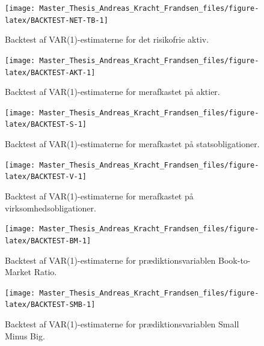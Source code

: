 \documentclass[
  a4paper,
  oneside]{memoir}
\begin{document}
\begin{figure}[H]

{\centering \texttt{[image: Master\_Thesis\_Andreas\_Kracht\_Frandsen\_files/figure-latex/BACKTEST-NET-TB-1]} 

}

\caption{Backtest af VAR(1)-estimaterne for det risikofrie aktiv.}\label{fig:BACKTEST-NET-TB}
\end{figure}

\begin{figure}[H]

{\centering \texttt{[image: Master\_Thesis\_Andreas\_Kracht\_Frandsen\_files/figure-latex/BACKTEST-AKT-1]} 

}

\caption{Backtest af VAR(1)-estimaterne for merafkastet på aktier.}\label{fig:BACKTEST-AKT}
\end{figure}

\begin{figure}[H]

{\centering \texttt{[image: Master\_Thesis\_Andreas\_Kracht\_Frandsen\_files/figure-latex/BACKTEST-S-1]} 

}

\caption{Backtest af VAR(1)-estimaterne for merafkastet på statsobligationer.}\label{fig:BACKTEST-S}
\end{figure}

\begin{figure}[H]

{\centering \texttt{[image: Master\_Thesis\_Andreas\_Kracht\_Frandsen\_files/figure-latex/BACKTEST-V-1]} 

}

\caption{Backtest af VAR(1)-estimaterne for merafkastet på virksomhedsobligationer.}\label{fig:BACKTEST-V}
\end{figure}

\begin{figure}[H]

{\centering \texttt{[image: Master\_Thesis\_Andreas\_Kracht\_Frandsen\_files/figure-latex/BACKTEST-BM-1]} 

}

\caption{Backtest af VAR(1)-estimaterne for prædiktionsvariablen Book-to-Market Ratio.}\label{fig:BACKTEST-BM}
\end{figure}

\begin{figure}[H]

{\centering \texttt{[image: Master\_Thesis\_Andreas\_Kracht\_Frandsen\_files/figure-latex/BACKTEST-SMB-1]} 

}

\caption{Backtest af VAR(1)-estimaterne for prædiktionsvariablen Small Minus Big.}\label{fig:BACKTEST-SMB}
\end{figure}
\end{document}

